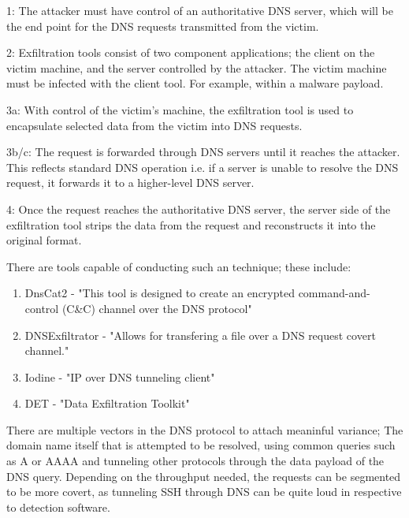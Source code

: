 \begin{displayquote}
\begin{textit}
1: The attacker must have control of an authoritative DNS
server, which will be the end point for the DNS requests
transmitted from the victim.

2: Exfiltration tools consist of two component applications; the client on the victim machine, and the server
controlled by the attacker. The victim machine must
be infected with the client tool. For example, within a
malware payload.

3a: With control of the victim’s machine, the exfiltration
tool is used to encapsulate selected data from the victim
into DNS requests.

3b/c: The request is forwarded through DNS servers
until it reaches the attacker. This reflects standard DNS
operation i.e. if a server is unable to resolve the DNS
request, it forwards it to a higher-level DNS server.

4: Once the request reaches the authoritative DNS server,
the server side of the exfiltration tool strips the data from
the request and reconstructs it into the original format.
\end{textit}
\end{displayquote}

There are tools capable of conducting such an technique; these include:
\begin{enumerate}
    \item DnsCat2 - "This tool is designed to create an encrypted command-and-control (C&C) channel over the DNS protocol" \citep{dnscat2}
    \item DNSExfiltrator - "Allows for transfering a file over a DNS request covert channel." \citep{DNSExfiltrator}
    \item Iodine - "IP over DNS tunneling client" \citep{iodine}
    \item DET - "Data Exfiltration Toolkit" \citep{DET}
\end{enumerate}

There are multiple vectors in the DNS protocol to attach meaninful variance; 
The domain name itself that is attempted to be resolved, using common queries such as A or AAAA and tunneling other protocols 
through the data payload of the DNS query. Depending on the throughput needed, the requests can be segmented to be more covert, as tunneling 
SSH through DNS can be quite loud in respective to detection software. \citep{DNSExfiltration}


